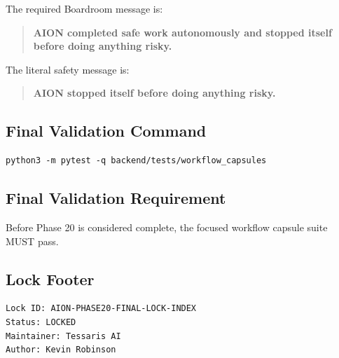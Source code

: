 The required Boardroom message is:

\begin{quote}
\textbf{AION completed safe work autonomously and stopped itself before doing anything risky.}
\end{quote}

The literal safety message is:

\begin{quote}
\textbf{AION stopped itself before doing anything risky.}
\end{quote}

\subsection{Final Validation Command}

\begin{verbatim}
python3 -m pytest -q backend/tests/workflow_capsules
\end{verbatim}

\subsection{Final Validation Requirement}

Before Phase 20 is considered complete, the focused workflow capsule suite MUST pass.

\subsection{Lock Footer}

\begin{verbatim}
Lock ID: AION-PHASE20-FINAL-LOCK-INDEX
Status: LOCKED
Maintainer: Tessaris AI
Author: Kevin Robinson
\end{verbatim}
